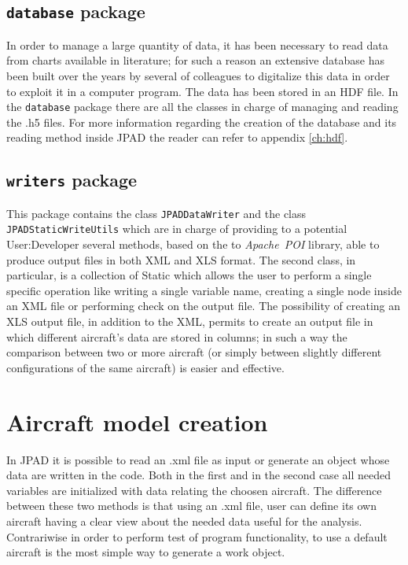 \subsection{\texttt{database} package}
In order to manage a large quantity of data, it has been necessary to read data from charts available in literature; for such a reason an extensive database has been built over the years by several of colleagues to digitalize this data in order to exploit it in a computer program. The data has been stored in an \gls{HDF} file. In the \lstinline[language=Java]!database! package there are all the classes in charge of managing and reading the .h5 files. For more information regarding the creation of the database and its reading method inside \gls{JPAD} the reader can refer to appendix \ref{ch:hdf}. 
%
\subsection{\texttt{writers} package}
This package contains the class \lstinline[language=Java]!JPADDataWriter! and the class \lstinline[language=Java]!JPADStaticWriteUtils! which are in charge of providing to a potential \gls{User:Developer} several methods, based on the to \emph{Apache~POI} library, able to produce output files in both XML and XLS format. The second class, in particular, is a collection of \gls{Static} which allows the user to perform a single specific operation like writing a single variable name, creating a single node inside an XML file or performing check on the output file. The possibility of creating an XLS output file, in addition to the XML, permits to create an output file in which different aircraft's data are stored in columns; in such a way the comparison between two or more aircraft (or simply between slightly different configurations of the same aircraft) is easier and effective.
%
\section{Aircraft model creation} \label{par:DefaultAircraft}
In \gls{JPAD} it is possible to read an .xml file as input or generate an object whose data are written in the code. Both in the first and in the second case all needed variables are initialized with data relating the choosen aircraft. The difference between these two methods is that using an .xml file, user can define its own aircraft having a clear view about the needed data useful for the analysis. Contrariwise in order to perform test of program functionality, to use a default aircraft is the most simple way to generate a work object.

